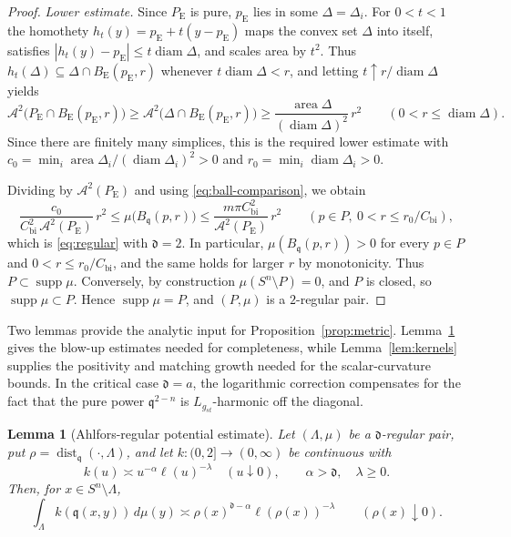 \documentclass[12pt,oneside,a4paper]{article}
\theoremstyle{mytheorem}
\newtheorem{lemma}[definition]{Lemma}
\theoremstyle{remark}
\theoremstyle{definition}
\begin{document}
\begin{proof}
\emph{Lower estimate.}  Since $P_{\mathrm E}$ is pure,
$p_{\mathrm E}$ lies in some $\Delta=\Delta_i$.  For $0<t<1$ the
homothety $h_t(y)=p_{\mathrm E}+t(y-p_{\mathrm E})$ maps
the convex set $\Delta$ into itself, satisfies
$|h_t(y)-p_{\mathrm E}|\le t\operatorname{diam}\Delta$, and scales area
by $t^2$.  Thus
$h_t(\Delta)\subseteq\Delta\cap B_{\mathrm E}(p_{\mathrm E},r)$ whenever
$t\operatorname{diam}\Delta<r$, and letting
$t\uparrow r/\operatorname{diam}\Delta$ yields
\[
 \mathcal{A}^2\bigl(P_{\mathrm E}\cap B_{\mathrm E}(p_{\mathrm E},r)\bigr)
 \ge\mathcal{A}^2\bigl(\Delta\cap B_{\mathrm E}(p_{\mathrm E},r)\bigr)
 \ge\frac{\operatorname{area}\Delta}{(\operatorname{diam}\Delta)^2}\,r^2
 \qquad(0<r\le\operatorname{diam}\Delta).
\]
Since there are finitely many simplices, this is the required lower
estimate with
$c_0=\min_i\operatorname{area}\Delta_i/(\operatorname{diam}\Delta_i)^2>0$
and $r_0=\min_i\operatorname{diam}\Delta_i>0$.

Dividing by $\mathcal{A}^2(P_{\mathrm E})$ and using
\eqref{eq:ball-comparison}, we
obtain
\[
 \frac{c_0}{C_{\mathrm{bi}}^2\,\mathcal{A}^2(P_{\mathrm E})}\,r^2
 \le\mu\bigl(B_{\mathfrak q}(p,r)\bigr)
 \le\frac{m\pi C_{\mathrm{bi}}^2}{\mathcal{A}^2(P_{\mathrm E})}\,r^2
 \qquad(p\in P,\ 0<r\le r_0/C_{\mathrm{bi}}),
\]
which is \eqref{eq:regular} with $\mathfrak d=2$.  In particular,
$\mu(B_{\mathfrak q}(p,r))>0$ for every $p\in P$ and
$0<r\leq r_0/C_{\mathrm{bi}}$, and the same
holds for larger $r$ by monotonicity.  Thus
$P\subset\operatorname{supp}\mu$.  Conversely, by construction
$\mu(S^n\setminus P)=0$, and $P$ is closed, so
$\operatorname{supp}\mu\subset P$.  Hence
$\operatorname{supp}\mu=P$, and $(P,\mu)$ is a $2$-regular pair.
\end{proof}




Two lemmas provide the analytic input for Proposition~\ref{prop:metric}.
Lemma~\ref{lem:potential} gives the blow-up estimates needed for
completeness, while Lemma~\ref{lem:kernels} supplies the positivity and
matching growth needed for the scalar-curvature bounds.  In the critical
case $\mathfrak d=a$, the logarithmic correction compensates for the fact that the
pure power $\mathfrak q^{2-n}$ is $L_{g_{st}}$-harmonic off the diagonal.

\begin{lemma}[Ahlfors-regular potential estimate]\label{lem:potential}
Let $(\Lambda,\mu)$ be a $\mathfrak d$-regular pair, put
$\rho=\operatorname{dist}_{\mathfrak q}(\cdot,\Lambda)$, and let
$k:(0,2]\to(0,\infty)$ be continuous with
\[
 k(u)\asymp u^{-\alpha}\ell(u)^{-\lambda}\quad(u\downarrow0),
 \qquad \alpha>\mathfrak d,\quad \lambda\ge0.
\]
Then, for $x\in S^n\setminus\Lambda$,
\begin{equation}\label{eq:potential}
 \int_\Lambda k(\mathfrak q(x,y))\,d\mu(y)
 \asymp \rho(x)^{\mathfrak d-\alpha}\ell(\rho(x))^{-\lambda}
 \qquad(\rho(x)\downarrow0).
\end{equation}
\end{lemma}
\end{document}
